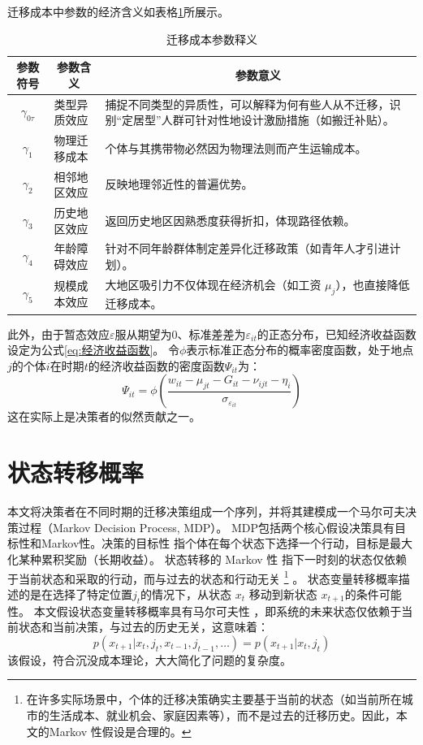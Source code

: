 \documentclass[a4paper, zihao=-4, fontset = mac, oneside]{ctexbook} %
\let\oldfootnote\footnote
\renewcommand{\footnote}[1]{%
  \oldfootnote{\setstretch{1.5}#1}%
}
\begin{document}
迁移成本中参数的经济含义如表格\ref{tab:迁移成本参数释义}所展示。
\begin{table}[!ht]
  \centering
  \caption{迁移成本参数释义}
  \label{tab:迁移成本参数释义}
  \begin{tabularx}{\textwidth}{@{}llX@{}}
    \toprule
    \multicolumn{1}{c}{\textbf{参数符号}} & \multicolumn{1}{c}{\textbf{参数含义}} & \multicolumn{1}{c}{\textbf{参数意义}} \\ \midrule
    \multicolumn{1}{c}{$\gamma_{0\tau}$} & 类型异质效应 & 捕捉不同类型的异质性，可以解释为何有些人从不迁移，识别“定居型”人群可针对性地设计激励措施（如搬迁补贴）。\\ 
    \multicolumn{1}{c}{$\gamma_1$} & 物理迁移成本 & 个体与其携带物必然因为物理法则而产生运输成本。 \\ 
    \multicolumn{1}{c}{$\gamma_2$} & 相邻地区效应 & 反映地理邻近性的普遍优势。 \\ 
    \multicolumn{1}{c}{$\gamma_3$} & 历史地区效应 & 返回历史地区因熟悉度获得折扣，体现路径依赖。 \\ 
    \multicolumn{1}{c}{$\gamma_4$} & 年龄障碍效应 & 针对不同年龄群体制定差异化迁移政策（如青年人才引进计划）。\\ 
    \multicolumn{1}{c}{$\gamma_5$} & 规模成本效应 & 大地区吸引力不仅体现在经济机会（如工资 $\mu_j$），也直接降低迁移成本。\\ \bottomrule
  \end{tabularx}
\end{table}


此外，由于暂态效应$\varepsilon$服从期望为0、标准差差为\(\varepsilon_{it}\)的正态分布，已知经济收益函数设定为公式\ref{eq:经济收益函数}。
令$\phi$表示标准正态分布的概率密度函数，处于地点$j$的个体$i$在时期$t$的经济收益函数的密度函数$\Psi_{it}$为：
\begin{equation}
  \Psi_{it}=\phi(\frac{w_{it} - \mu_{jt} - G_{it} - \nu_{ijt} - \eta_i }{\sigma_{\varepsilon_{it}}})
  \label{eq:经济收益似然贡献}
\end{equation}
这在实际上是决策者的似然贡献之一。

\section{状态转移概率}

本文将决策者在不同时期的迁移决策组成一个序列，并将其建模成一个马尔可夫决策过程（Markov Decision Process, MDP）。
MDP包括两个核心假设决策具有目标性和Markov性。决策的目标性 指个体在每个状态下选择一个行动，目标是最大化某种累积奖励（长期收益）。
状态转移的 Markov 性 指下一时刻的状态仅依赖于当前状态和采取的行动，而与过去的状态和行动无关
\footnote{在许多实际场景中，个体的迁移决策确实主要基于当前的状态（如当前所在城市的生活成本、就业机会、家庭因素等），而不是过去的迁移历史。因此，本文的Markov 性假设是合理的。}。
状态变量转移概率描述的是在选择了特定位置$j_{t}$的情况下，从状态 $x_t$ 移动到新状态 $x_{t+1}$的条件可能性。
本文假设状态变量转移概率具有马尔可夫性
，即系统的未来状态仅依赖于当前状态和当前决策，与过去的历史无关，这意味着：
\begin{equation}
  p(x_{t+1}|x_{t},j_{t},x_{t-1},j_{t-1},\ldots)=p(x_{t+1}|x_{t},j_{t})
\end{equation}
该假设，符合沉没成本理论，大大简化了问题的复杂度。
\end{document}
